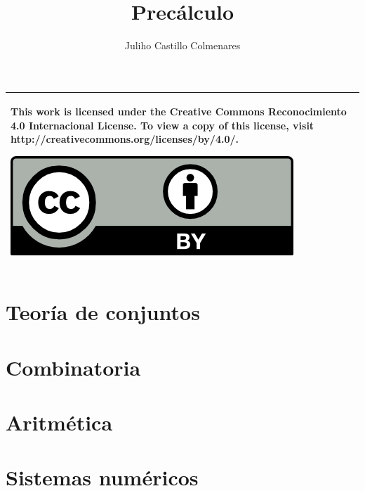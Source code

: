 \documentclass[
]{tufte-book}
\title{Precálculo}
\author{Juliho Castillo Colmenares}
\begin{document}
	\maketitle
\begin{tabular}{|p{}|}
	\hline
	This work is licensed under the Creative Commons Reconocimiento 4.0 Internacional License. To view a copy of this license, visit
	http://creativecommons.org/licenses/by/4.0/.
	\begin{center}
		\includegraphics[scale=1]{./licencia/by.png}
	\end{center}\\
	\hline
\end{tabular}
\tableofcontents

\chapter{Teoría de conjuntos}



 



 

\chapter{Combinatoria}







\chapter{Aritmética}







\chapter{Sistemas numéricos}





\end{document}
